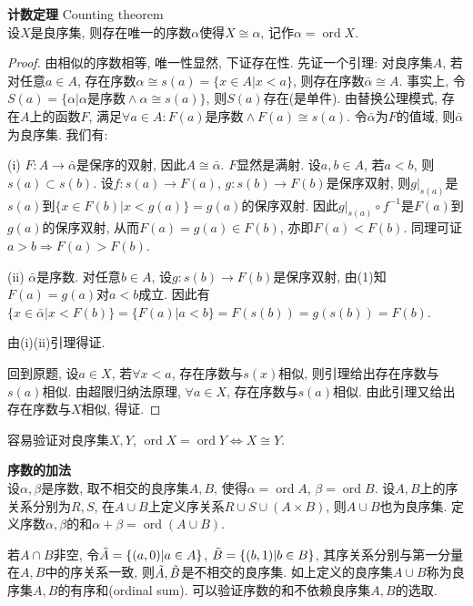 \begin{thm} \textbf{计数定理} Counting theorem\\
设$X$是良序集, 则存在唯一的序数$\alpha$使得$X\cong \alpha$, 记作$\alpha=\operatorname{ord}X$. 
\end{thm}
\begin{proof}
\par 由相似的序数相等, 唯一性显然, 下证存在性. 先证一个引理: 对良序集$A$, 若对任意$a\in A$, 存在序数$\alpha \cong s(a)=\{x\in A\vert x<a\}$, 则存在序数$\bar{\alpha}\cong A$. 事实上, 令$S(a)=\{\alpha\vert \alpha\text{是序数} \land \alpha\cong s(a)\}$, 则$S(a)$存在(是单件). 由替换公理模式, 存在$A$上的函数$F$, 满足$\forall a\in A: F(a)\text{是序数} \land F(a)\cong s(a)$. 令$\bar{\alpha}$为$F$的值域, 则$\bar{\alpha}$为良序集. 我们有:
\par (i) $F:A\to \bar{\alpha}$是保序的双射, 因此$A\cong \bar{\alpha}$. $F$显然是满射. 设$a,b\in A$, 若$a<b$, 则$s(a)\subset s(b)$. 设$f:s(a)\to F(a)$, $g:s(b)\to F(b)$是保序双射, 则$g\vert_{s(a)}$是$s(a)$到$\{x\in F(b)\vert x<g(a)\}=g(a)$的保序双射. 因此$g\vert_{s(a)}\circ f^{-1}$是$F(a)$到$g(a)$的保序双射, 从而$F(a)=g(a)\in F(b)$, 亦即$F(a)<F(b)$. 同理可证$a>b\Rightarrow F(a)>F(b)$. 
\par (ii) $\bar{\alpha}$是序数. 对任意$b\in A$, 设$g:s(b)\to F(b)$是保序双射, 由(1)知$F(a)=g(a)$对$a<b$成立. 因此有$\{x\in \bar{\alpha}\vert x<F(b)\}=\{F(a)\vert a<b\}=F(s(b))=g(s(b))=F(b)$.
\par 由(i)(ii)引理得证. 
\par 回到原题, 设$a\in X$, 若$\forall x<a$, 存在序数与$s(x)$相似, 则引理给出存在序数与$s(a)$相似. 由超限归纳法原理, $\forall a\in X$, 存在序数与$s(a)$相似. 由此引理又给出存在序数与$X$相似, 得证. 
\end{proof}

\par 容易验证对良序集$X,Y$, $\operatorname{ord}X=\operatorname{ord}Y\iff X\cong Y$.

\begin{dfn} \textbf{序数的加法}\\
设$\alpha,\beta$是序数, 取不相交的良序集$A,B$, 使得$\alpha=\operatorname{ord}A$, $\beta=\operatorname{ord}B$. 设$A,B$上的序关系分别为$R,S$, 在$A\cup B$上定义序关系$R\cup S \cup (A\times B)$, 则$A\cup B$也为良序集. 定义序数$\alpha,\beta$的和$\alpha+\beta=\operatorname{ord}(A\cup B)$. 
\end{dfn}
\par 若$A\cap B$非空, 令$\Tilde{A}=\{(a,0)\vert a\in A\}$, $\Tilde{B}=\{(b,1)\vert b\in B\}$, 其序关系分别与第一分量在$A,B$中的序关系一致, 则$\Tilde{A}, \Tilde{B}$是不相交的良序集. 如上定义的良序集$A\cup B$称为良序集$A,B$的有序和(ordinal sum). 可以验证序数的和不依赖良序集$A,B$的选取. 

